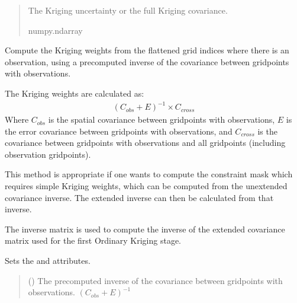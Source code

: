 \documentclass[letterpaper,10pt,english]{sphinxmanual}
\begin{document}
\begin{fulllineitems}
\begin{fulllineitems}
\begin{quote}
\begin{description}
\sphinxAtStartPar
{} \textendash{} The Kriging uncertainty or the full Kriging covariance.

\sphinxAtStartPar
numpy.ndarray

\end{description}\end{quote}

\end{fulllineitems}


\begin{fulllineitems}
\label{\detokenize{kriging:glomar_gridding.stochastic.StochasticKriging.kriging_weights_from_inverse}}
\pysigstartsignatures
\pysiglinewithargsret
{}
{}
{}
\pysigstopsignatures
\sphinxAtStartPar
Compute the Kriging weights from the flattened grid indices where
there is an observation, using a pre\sphinxhyphen{}computed inverse of the covariance
between grid\sphinxhyphen{}points with observations.

\sphinxAtStartPar
The Kriging weights are calculated as:
\begin{equation*}
\begin{split}(C_{obs} + E)^{-1} \times C_{cross}\end{split}
\end{equation*}
\sphinxAtStartPar
Where \(C_{obs}\) is the spatial covariance between grid\sphinxhyphen{}points
with observations, \(E\) is the error covariance between grid\sphinxhyphen{}points
with observations, and \(C_{cross}\) is the covariance between
grid\sphinxhyphen{}points with observations and all grid\sphinxhyphen{}points (including observation
grid\sphinxhyphen{}points).

\sphinxAtStartPar
This method is appropriate if one wants to compute the constraint mask
which requires simple Kriging weights, which can be computed from the
unextended covariance inverse. The extended inverse can then be
calculated from that inverse.

\sphinxAtStartPar
The inverse matrix is used to compute the inverse of the extended
covariance matrix used for the first Ordinary Kriging stage.

\sphinxAtStartPar
Sets the  and  attributes.
\begin{quote}\begin{description}
\sphinxAtStartPar
{} () \textendash{} The pre\sphinxhyphen{}computed inverse of the covariance between grid\sphinxhyphen{}points with
observations. \((C_{obs} + E)^{-1}\)


\end{description}
\end{quote}
\end{fulllineitems}
\end{fulllineitems}
\end{document}
